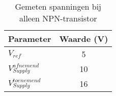 \begin{table}[h!]
\centering
\begin{tabular}{|l|c|}
\hline
\textbf{Parameter} & \textbf{Waarde (V)} \\ \hline
\(V_{ref}\) & 5 \\ \hline
\(V_{Supply}^{afnemend}\) & 10 \\ \hline
\(V_{Supply}^{toenemend}\) & 16 \\ \hline
\end{tabular}
\caption{Gemeten spanningen bij alleen NPN-transistor}
\label{tab:npn_waarden}
\end{table}